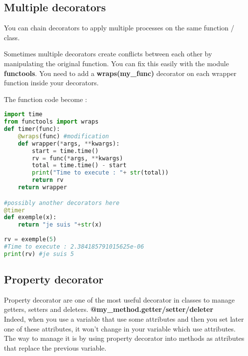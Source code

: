 \documentclass[a4paper, 12pt, titlepage]{scrartcl} %
\begin{document}
\subsection{Multiple decorators}
You can chain decorators to apply multiple processes on the same function / class. 

\vspace{5mm}

Sometimes multiple decorators create conflicts between each other by manipulating the original function. You can fix this easily with the module \textbf{functools}. You need to add a \textbf{wraps(my\_func)} decorator on each wrapper function inside your decorators.

\vspace{5mm}

The function code become :
\begin{lstlisting}[language=Python]
import time
from functools import wraps
def timer(func):
    @wraps(func) #modification
	def wrapper(*args, **kwargs):
		start = time.time()
		rv = func(*args, **kwargs)
		total = time.time() - start
		print("Time to execute : "+ str(total))
		return rv
	return wrapper

#possibly another decorators here
@timer
def exemple(x):
	return "je suis "+str(x)
	
rv = exemple(5)
#Time to execute : 2.384185791015625e-06
print(rv) #je suis 5
\end{lstlisting} \vspace{5mm}

\subsection{Property decorator}
\label{subsec:Property}
Property decorator are one of the most useful decorator in classes to manage getters, setters and deleters. \textbf{@my\_method.getter/setter/deleter}\\
Indeed, when you use a variable that use some attributes and then you set later one of these attributes, it won't change in your variable which use attributes. \\
The way to manage it is by using property decorator into methods as attributes that replace the previous variable.

\vspace{5mm}
\end{document}
